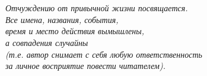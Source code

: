 \chapter*{}
\begin{flushright}
\vspace{2.0cm}
\textit{ \large {
Отчуждению от привычной жизни посвящается.\\
\vspace{\fill}
Все имена, названия, события,\\
время и место действия вымышлены,\\
а совпадения случайны\\
(т.е. автор снимает с себя любую ответственность\\ 
за личное восприятие повести читателем).
}}
\end{flushright}



